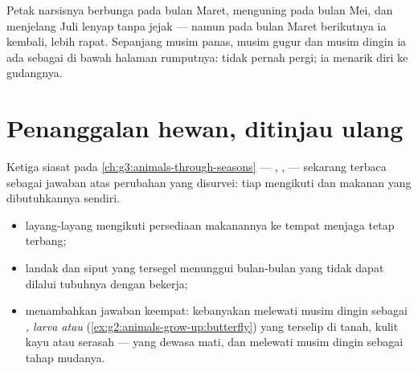 \begin{example}\label{ex:g6:life-through-seasons:daffodil}
Petak  narsisnya berbunga pada bulan Maret, menguning pada bulan
Mei, dan menjelang Juli lenyap tanpa jejak --- namun pada bulan Maret
berikutnya ia kembali, lebih rapat. Sepanjang musim panas, musim gugur
dan musim dingin ia ada sebagai  di bawah halaman rumputnya:
 tidak pernah pergi; ia menarik diri ke gudangnya.
\end{example}

\section{Penanggalan hewan, ditinjau ulang}

\begin{proposition}\label{prop:g6:life-through-seasons:animals}
Ketiga siasat pada \cref{ch:g3:animals-through-seasons} ---
, ,  --- sekarang terbaca sebagai
jawaban atas perubahan yang disurvei: tiap  mengikuti 
dan makanan yang dibutuhkannya sendiri.
\begin{itemize}
  \item {} layang-layang mengikuti persediaan makanannya ke tempat
         menjaga  tetap terbang;
  \item landak dan siput yang tersegel menunggui bulan-bulan yang
        tidak dapat dilalui tubuhnya dengan bekerja;
  \item {} menambahkan jawaban keempat: kebanyakan melewati
        musim dingin sebagai \emph{, larva atau }
        (\cref{ex:g2:animals-grow-up:butterfly}) yang terselip di
        tanah, kulit kayu atau serasah --- yang dewasa mati, dan
         melewati musim dingin sebagai tahap mudanya.
\end{itemize}
\end{proposition}
\admitted

